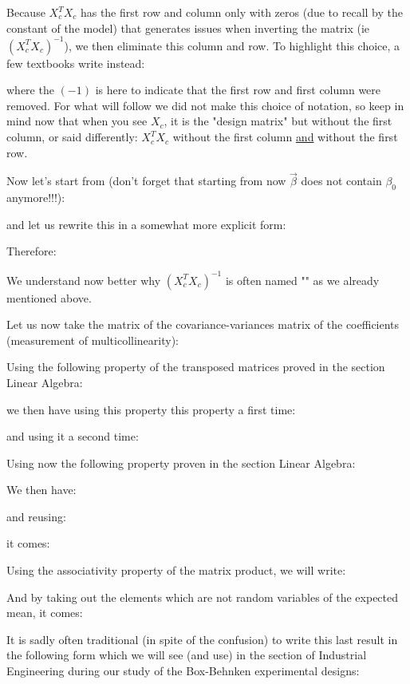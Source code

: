 	\begin{tcolorbox}[title=Remark,colframe=black,arc=10pt]
	Because $X_c^TX_c$ has the first row and column only with zeros (due to recall by the constant of the model) that generates issues when inverting the matrix (ie $(X_c^TX_c)^{-1}$), we then eliminate this column and row. To highlight this choice, a few textbooks write instead:
	
	where the $(-1)$ is here to indicate that the first row and first column were removed. For what will follow we did not make this choice of notation, so keep in mind now that when you see $X_c$, it is the "design matrix" but without the first column, or said differently: $X_c^TX_c$ without the first column \underline{and} without the first row.
	\end{tcolorbox}
	Now let's start from (don't forget that starting from now $\vec{\beta}$ does not contain $\beta_0$ anymore!!!):
	
 	and let us rewrite this in a somewhat more explicit form:
	
	Therefore:
	
	We understand now better why $(X_c^TX_c)^{-1}$ is often named "" as we already mentioned above.

	Let us now take the matrix of the covariance-variances matrix of the coefficients (measurement of multicollinearity):
	
 	Using the following property of the transposed matrices proved in the section Linear Algebra:
	
	we then have using this property this property a first time:
	
	and using it a second time:
	
	Using now the following property proven in the section Linear Algebra:
	
	We then have:
	
	and reusing:
	
	it comes:
	
	Using the associativity property of the matrix product, we will write:
	
	And by taking out the elements which are not random variables of the expected mean, it comes:
	
	It is sadly often traditional (in spite of the confusion) to write this last result in the following form which we will see (and use) in the section of Industrial Engineering during our study of the Box-Behnken experimental designs:
	
